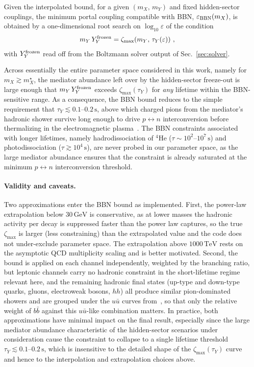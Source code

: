 \documentclass[11pt]{article}
\numberwithin{equation}{section}
\begin{document}
Given the interpolated bound, for a given $(m_X,\,m_Y)$ and fixed hidden-sector couplings, the minimum portal coupling compatible with BBN, $\varepsilon_{\rm BBN}(m_X)$, is obtained by a one-dimensional root search on $\log_{10}\varepsilon$ of the condition
\begin{equation}
    m_Y\,Y_Y^{\rm frozen} = \zeta_{\max}\!\left(m_Y,\,\tau_Y(\varepsilon)\right)\,,
\end{equation}
with $Y_Y^{\rm frozen}$ read off from the Boltzmann solver output of Sec.~\ref{sec:solver}.

Across essentially the entire parameter space considered in this work, namely for $m_X\gtrsim m_X^\star$, the mediator abundance left over by the hidden-sector freeze-out is large enough that $m_Y\,Y_Y^{\rm frozen}$ exceeds $\zeta_{\max}(\tau_Y)$ for \emph{any} lifetime within the BBN-sensitive range. As a consequence, the BBN bound reduces to the simple requirement that $\tau_Y \lesssim 0.1$--$0.2\,\mathrm{s}$, above which charged pions from the mediator's hadronic shower survive long enough to drive $p\leftrightarrow n$ interconversion before thermalizing in the electromagnetic plasma~\cite{Kawasaki:2017bqm}. The BBN constraints associated with longer lifetimes, namely hadrodissociation of ${}^4\mathrm{He}$ ($\tau\sim 10^2$--$10^7\,\mathrm{s}$) and photodissociation ($\tau\gtrsim 10^4\,\mathrm{s}$), are never probed in our parameter space, as the large mediator abundance ensures that the constraint is already saturated at the minimum $p\leftrightarrow n$ interconversion threshold.


\paragraph{Validity and caveats.}
Two approximations enter the BBN bound as implemented. First, the power-law extrapolation below $30\,\mathrm{GeV}$ is conservative, as at lower masses the hadronic activity per decay is suppressed faster than the power law captures, so the true $\zeta_{\max}$ is larger (less constraining) than the extrapolated value and the code does not under-exclude parameter space. The extrapolation above $1000\,\mathrm{TeV}$ rests on the asymptotic QCD multiplicity scaling and is better motivated. Second, the bound is applied on each channel independently, weighted by the branching ratio, but leptonic channels carry no hadronic constraint in the short-lifetime regime relevant here, and the remaining hadronic final states (up-type and down-type quarks, gluons, electroweak bosons, $hh$) all produce similar pion-dominated showers and are grouped under the $u\bar u$ curves from~\cite{Kawasaki:2017bqm}, so that only the relative weight of $b\bar b$ against this $u\bar u$-like combination matters. In practice, both approximations have minimal impact on the final result, especially since the large mediator abundance characteristic of the hidden-sector scenarios under consideration cause the constraint to collapse to a single lifetime threshold $\tau_Y\lesssim 0.1$--$0.2\,\mathrm{s}$, which is insensitive to the detailed shape of the $\zeta_{\max}(\tau_Y)$ curve and hence to the interpolation and extrapolation choices above.
\end{document}
